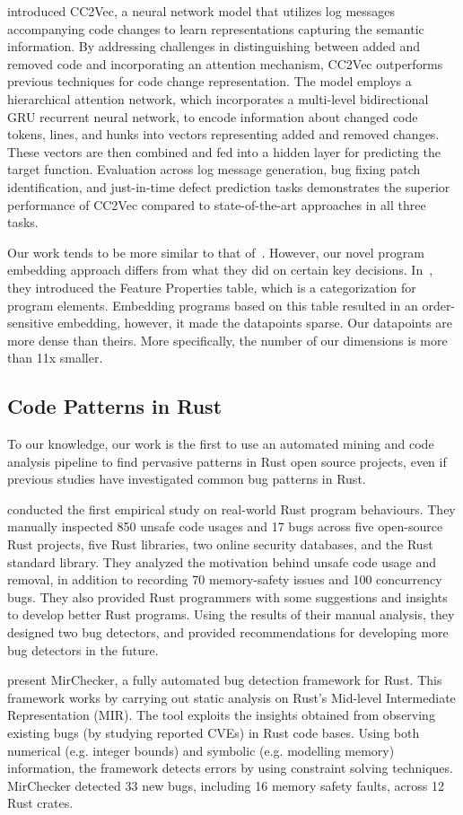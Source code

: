 \cite{hoang2020cc2vec} introduced CC2Vec, a neural network model that utilizes log messages accompanying code changes to learn representations capturing the semantic information. By addressing challenges in distinguishing between added and removed code and incorporating an attention mechanism, CC2Vec outperforms previous techniques for code change representation. The model employs a hierarchical attention network, which incorporates a multi-level bidirectional GRU recurrent neural network, to encode information about changed code tokens, lines, and hunks into vectors representing added and removed changes. These vectors are then combined and fed into a hidden layer for predicting the target function. Evaluation across log message generation, bug fixing patch identification, and just-in-time defect prediction tasks demonstrates the superior performance of CC2Vec compared to state-of-the-art approaches in all three tasks.

Our work tends to be more similar to that of~\cite{hanam2016discovering}. However, our novel program embedding approach differs from what they did on certain key decisions. In~\cite{hanam2016discovering}, they introduced the Feature Properties table, which is a categorization for program elements. Embedding programs based on this table resulted in an order-sensitive embedding, however, it made the datapoints sparse. Our datapoints are more dense than theirs. More specifically, the number of our dimensions is more than 11x smaller.

\subsection{Code Patterns in Rust}

To our knowledge, our work is the first to use an automated mining and code analysis pipeline to find pervasive patterns in Rust open source projects, even if previous studies have investigated common bug patterns in Rust.

\cite{qin2020understanding} conducted the first empirical study on real-world Rust program behaviours. They manually inspected 850 unsafe code usages and 17 bugs across five open-source Rust projects, five Rust libraries, two online security databases, and the Rust standard library. They analyzed the motivation behind unsafe code usage and removal, in addition to recording 70 memory-safety issues and 100 concurrency bugs. They also provided Rust programmers with some suggestions and insights to develop better Rust programs. Using the results of their manual analysis, they designed two bug detectors, and provided recommendations for developing more bug detectors in the future.

\cite{li2021mirchecker} present MirChecker, a fully automated bug detection framework for Rust. This framework works by carrying out static analysis on Rust's Mid-level Intermediate Representation (MIR). The tool exploits the insights obtained from observing existing bugs (by studying reported CVEs) in Rust code bases. Using both numerical (e.g. integer bounds) and symbolic (e.g. modelling memory) information, the framework detects errors by using constraint solving techniques. MirChecker detected 33 new bugs, including 16 memory safety faults, across 12 Rust crates.

